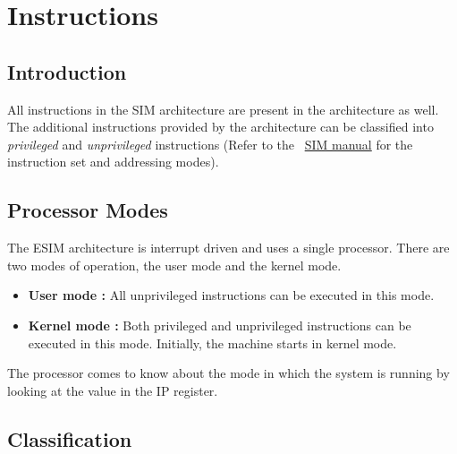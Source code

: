 \chapter{Instructions}
\label{chp:instr}

\section{Introduction}
All instructions in the SIM architecture are present in the \ESIM architecture as well. The additional instructions provided by the \ESIM architecture can be classified into \emph{privileged} and \emph{unprivileged} instructions (Refer to the ~\href{http://www.athena.nitc.ac.in/~kmurali/Compiler/sim.html}{SIM manual} for the  instruction set and addressing modes). %

\section{Processor Modes}
\label{sec:modes}
The ESIM architecture is interrupt driven and uses a single processor. There are two modes of operation, the user mode and the kernel mode.
\begin{itemize}
	\item \textbf{User mode :} All unprivileged instructions can be executed in this mode. 
	\item \textbf{Kernel mode :} Both privileged and unprivileged instructions can be executed in this mode. Initially, the machine starts in kernel mode.
\end{itemize}

The processor comes to know about the mode in which the system is running by looking at the value in the IP register.

\section{Classification}
